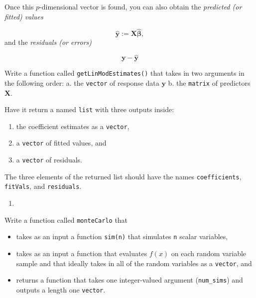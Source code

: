 \documentclass[12pt,krantz2]{krantz}
\providecommand{\tightlist}{%
  \setlength{\itemsep}{0pt}\setlength{\parskip}{0pt}}
\begin{document}
Once this \(p\)-dimensional vector is found, you can also obtain the \emph{predicted (or fitted) values}

\begin{equation} 
\hat{\mathbf{y}} := \mathbf{X}\hat{\boldsymbol{\beta}},
\end{equation}
and the \emph{residuals (or errors)}

\begin{equation} 
\mathbf{y} - \hat{\mathbf{y}}
\end{equation}

Write a function called \texttt{getLinModEstimates()} that takes in two arguments in the following order:
a. the \texttt{vector} of response data \(\mathbf{y}\)
b. the \texttt{matrix} of predictors \(\mathbf{X}\).

Have it return a named \texttt{list} with three outputs inside:

\begin{enumerate}
\def\labelenumi{\alph{enumi}.}
\tightlist
\item
  the coefficient estimates as a \texttt{vector},
\item
  a \texttt{vector} of fitted values, and
\item
  a \texttt{vector} of residuals.
\end{enumerate}

The three elements of the returned list should have the names \texttt{coefficients}, \texttt{fitVals}, and \texttt{residuals}.

\begin{enumerate}
\def\labelenumi{\arabic{enumi}.}
\setcounter{enumi}{1}
\item
\end{enumerate}

Write a function called \texttt{monteCarlo} that

\begin{itemize}
\tightlist
\item
  takes as an input a function \texttt{sim(n)} that simulates \texttt{n} scalar variables,\\
\item
  takes as an input a function that evaluates \(f(x)\) on each random variable sample and that ideally takes in all of the random variables as a \texttt{vector}, and
\item
  returns a function that takes one integer-valued argument (\texttt{num\_sims}) and outputs a length one \texttt{vector}.
\end{itemize}
\end{document}
